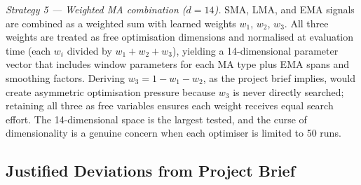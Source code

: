 \textit{Strategy 5 --- Weighted MA combination ($d=14$).} SMA, LMA, and EMA
signals are combined as a weighted sum with learned weights $w_1$, $w_2$,
$w_3$. All three weights are treated as free optimisation dimensions and
normalised at evaluation time (each $w_i$ divided by $w_1 + w_2 + w_3$),
yielding a 14-dimensional parameter vector that includes window parameters
for each MA type plus EMA spans and smoothing factors. Deriving $w_3 = 1 -
w_1 - w_2$, as the project brief implies, would create asymmetric
optimisation pressure because $w_3$ is never directly searched; retaining
all three as free variables ensures each weight receives equal search
effort. The 14-dimensional space is the largest tested, and the curse of
dimensionality is a genuine concern when each optimiser is limited to 50 runs.

\subsection{Justified Deviations from Project Brief}

